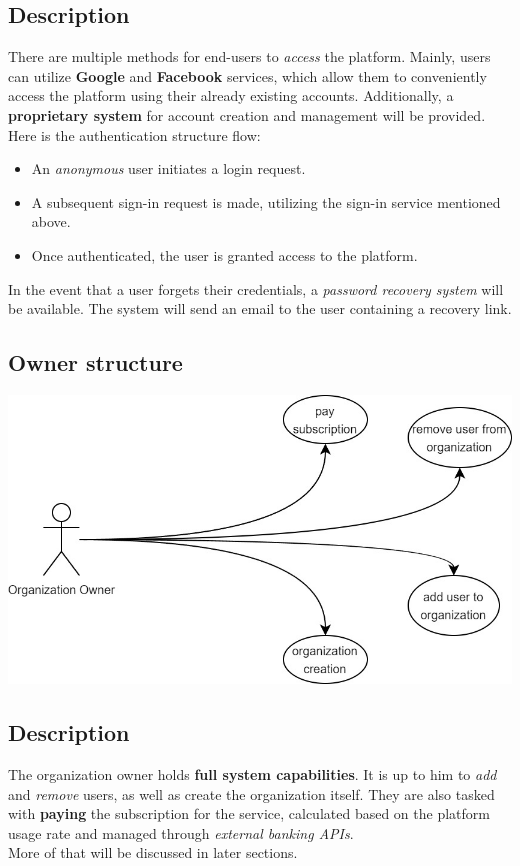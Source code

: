 \documentclass{article}
\begin{document}
\subsection*{Description}
There are multiple methods for end-users to \textit{access} the platform. Mainly, users can utilize \textbf{Google} and \textbf{Facebook} services, which allow them to conveniently access the platform using their already existing accounts. Additionally, a \textbf{proprietary system} for account creation and management will be provided.\\
Here is the authentication structure flow:
\begin{itemize}
    \item  An \textit{anonymous} user initiates a login request.
    \item A subsequent sign-in request is made, utilizing the sign-in service mentioned above.
    \item  Once authenticated, the user is granted access to the platform.
\end{itemize}
In the event that a user forgets their credentials, a \textit{password recovery system} will be available. The system will send an email to the user containing a recovery link.
\subsection{Owner structure}
\includegraphics[width=\textwidth, keepaspectratio]{images/UseCaseDiagram/UseCaseOwner.jpg}
\subsection*{Description}
The organization owner holds \textbf{full system capabilities}. It is up to him to \textit{add} and \textit{remove} users, as well as create the organization itself. They are also tasked with \textbf{paying} the subscription for the service, calculated based on the platform usage rate and managed through \textit{external banking APIs}.\\
More of that will be discussed in later sections.
\end{document}
